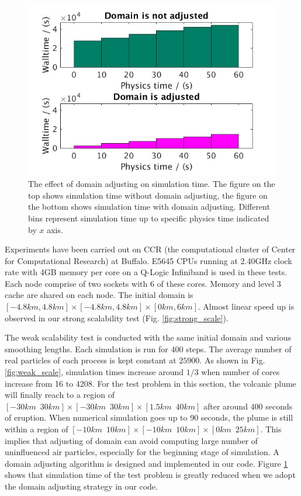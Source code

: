 \documentclass[journal abbreviation, manuscript]{copernicus}
\begin{document}
\begin{figure}[!t]
\centering
\includegraphics[scale=0.35]{adj_vs_no}
\caption{The effect of domain adjusting on simulation time. The figure on the top shows simulation time without domain adjusting, the figure on the bottom shows simulation time with domain adjusting. Different bins represent simulation time up to specific physics time indicated by $x$ axis.}
\label{fig:adj_vs_no}
\end{figure}

Experiments have been carried out on CCR (the computational cluster of Center for Computational Research) at Buffalo. E5645 CPUs running at 2.40GHz clock rate with 4GB memory per core on a Q-Logic Infiniband is used in these tests. Each node comprise of two sockets with 6 of these cores. Memory and level 3 cache are shared on each node. The initial domain is $[-4.8km,4.8km] \times [-4.8km,4.8km] \times [0km, 6km]$. Almost linear speed up is observed in our strong scalability test (Fig. \ref{fig:strong_scale}).

The weak scalability test is conducted with the same initial domain and various smoothing lengths. Each simulation is run for 400 steps. The average number of real particles of each process is kept constant at $25900$. As shown in Fig. \ref{fig:weak_scale}, simulation times increase around $1/3$ when number of cores increase from 16 to 4208. For the test problem in this section, the volcanic plume will finally reach to a region of $[-30km \,\,\, 30km] \times [-30km\,\,\,30km] \times [1.5km\,\,\,40km]$ after around 400 seconds of eruption. When numerical simulation goes up to 90 seconds, the plume is still within a region of $[-10km\,\,\,10km] \times [-10km\,\,\,10km] \times [0km\,\,\,25km]$. This implies that adjusting of domain can avoid computing large number of uninfluenced air particles, especially for the beginning stage of simulation. A domain adjusting algorithm is designed and implemented in our code. Figure \ref{fig:adj_vs_no} shows that simulation time of the test problem is greatly reduced when we adopt the domain adjusting strategy in our code.
\end{document}
